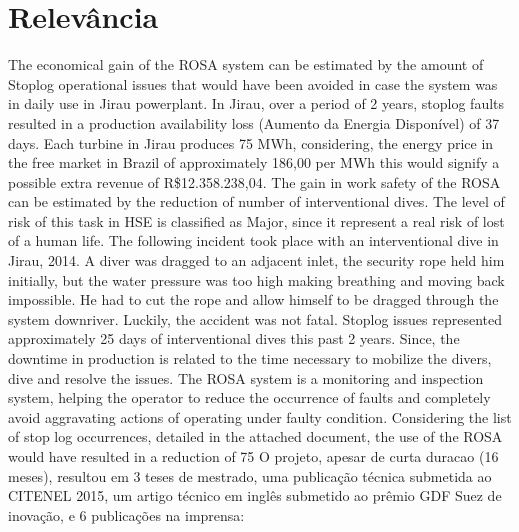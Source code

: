 \chapter{Relevância}
The economical gain of the ROSA system can be estimated by the amount of Stoplog 
operational issues that would have been avoided in case the system was in daily 
use in Jirau powerplant. In Jirau, over a period of 2 years, stoplog faults resulted 
in a production availability loss (Aumento da Energia Disponível) of 37 days.
 Each turbine in Jirau produces 75 MWh, considering, the energy price in the free 
 market in Brazil of approximately 186,00 per MWh this would signify a possible 
 extra revenue of R\$12.358.238,04. 
	The gain in work safety of the ROSA can be estimated by the reduction of number 
	of interventional dives. The level of risk of this task in HSE is classified as 
	Major, since it represent a real risk of lost of a human life. The following 
	incident took place with an interventional dive in Jirau, 2014. A diver was 
	dragged to an adjacent inlet, the security rope held him initially, but the 
	water pressure was too high making breathing and moving back impossible. He 
	had to cut the rope and allow himself to be dragged through the system 
downriver. Luckily, the accident was not fatal. 
	Stoplog issues represented approximately 25 days of interventional dives 
	this past 2 years. Since, the downtime in production is related to the time 
	necessary to mobilize the divers, dive and resolve the issues. The ROSA system
	 is a monitoring and inspection system, helping the operator to reduce the 
	 occurrence of faults and completely avoid aggravating actions of operating 
	 under faulty condition. Considering the list of stop log occurrences, 
	 detailed in the attached document, the use of the ROSA would have resulted 
	 in a reduction of 75%
	O projeto, apesar de curta duracao (16 meses), resultou em 3 teses de 
	mestrado, uma publicação técnica submetida ao CITENEL 2015, um artigo técnico 
	em inglês submetido ao prêmio GDF Suez de inovação, e 6 publicações na imprensa: 
 


